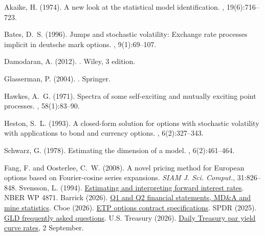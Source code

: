 \begin{thebibliography}{}

Akaike, H. (1974).
\newblock A new look at the statistical model identification.
, 19(6):716--723.

Bates, D.~S. (1996).
\newblock Jumps and stochastic volatility: Exchange rate processes implicit in
  deutsche mark options.
, 9(1):69--107.

Damodaran, A. (2012).
.
\newblock Wiley, 3 edition.

Glasserman, P. (2004).
.
\newblock Springer.

Hawkes, A.~G. (1971).
\newblock Spectra of some self-exciting and mutually exciting point processes.
, 58(1):83--90.

Heston, S.~L. (1993).
\newblock A closed-form solution for options with stochastic volatility with
  applications to bond and currency options.
, 6(2):327--343.

Schwarz, G. (1978).
\newblock Estimating the dimension of a model.
, 6(2):461--464.


Fang, F. and Oosterlee, C.~W. (2008). A novel pricing method for European options based on Fourier-cosine series expansions. {\em SIAM J. Sci. Comput.}, 31:826--848.
Svensson, L. (1994). \href{https://www.nber.org/papers/w4871}{Estimating and interpreting forward interest rates}. NBER WP 4871.
Barrick (2026). \href{https://www.barrick.com/English/investors/quarterly-reports/default.aspx}{Q1 and Q2 financial statements, MD\&A and mine statistics}.
Cboe (2026). \href{https://www.cboe.com/exchange-traded-stock/etp-options-spec}{ETP options contract specifications}.
SPDR (2025). \href{https://files.spdrgoldshares.com/spdr-cms/2025-10/GLD-FAQs-January-2025.pdf}{GLD frequently asked questions}.
U.S. Treasury (2026). \href{https://home.treasury.gov/resource-center-data-chart-center/interest-rates}{Daily Treasury par yield curve rates}, 2 September.


\end{thebibliography}
